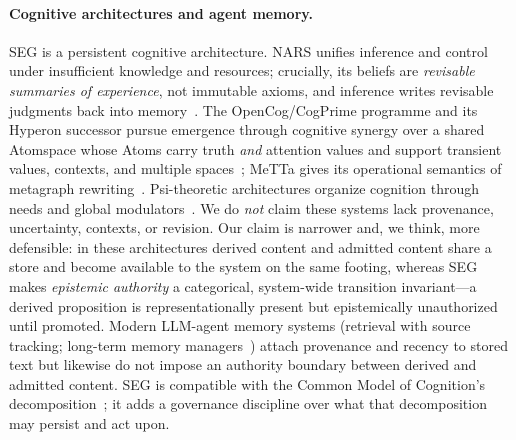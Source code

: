 \documentclass[11pt]{article}
\theoremstyle{plain}
\theoremstyle{definition}
\begin{document}
\paragraph{Cognitive architectures and agent memory.} SEG is a persistent
cognitive architecture. NARS unifies inference and control under insufficient
knowledge and resources; crucially, its beliefs are \emph{revisable summaries of
experience}, not immutable axioms, and inference writes revisable judgments back
into memory~\cite{wang2013}. The OpenCog/CogPrime programme and its Hyperon
successor pursue emergence through cognitive synergy over a shared Atomspace whose
Atoms carry truth \emph{and} attention values and support transient values,
contexts, and multiple spaces~\cite{goertzel2014,goertzel2023}; MeTTa gives its
operational semantics of metagraph rewriting~\cite{meredith2023}. Psi-theoretic
architectures organize cognition through needs and global
modulators~\cite{bach2015}. We do \emph{not} claim these systems lack provenance,
uncertainty, contexts, or revision. Our claim is narrower and, we think, more
defensible: in these architectures derived content and admitted content share a
store and become available to the system on the same footing, whereas SEG makes
\emph{epistemic authority} a categorical, system-wide transition invariant---a
derived proposition is representationally present but epistemically unauthorized
until promoted. Modern LLM-agent memory systems (retrieval with source tracking;
long-term memory managers~\cite{park2023,packer2023}) attach provenance and
recency to stored text but likewise do not impose an authority boundary between
derived and admitted content. SEG is compatible with the Common Model of
Cognition's decomposition~\cite{laird2017}; it adds a governance discipline over
what that decomposition may persist and act upon.
\end{document}

